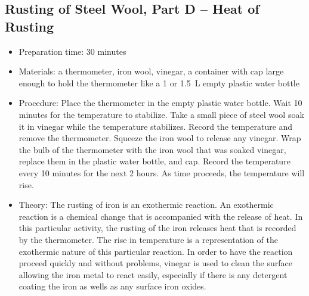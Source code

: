 \subsection{Rusting of Steel Wool, Part D -- Heat of Rusting}
\begin{itemize}
\item{Preparation time: 30 minutes}
\item{Materials: a thermometer, iron wool, vinegar, a container with cap large enough to hold the thermometer like a 1 or 1.5~L empty plastic water bottle}
\item{Procedure: Place the thermometer in the empty plastic water bottle. Wait 10 minutes for the temperature to stabilize. Take a small piece of steel wool soak it in vinegar while the temperature stabilizes. Record the temperature and remove the thermometer. Squeeze the iron wool to release any vinegar. Wrap the bulb of the thermometer with the iron wool that was soaked vinegar, replace them in the plastic water bottle, and cap. Record the temperature every 10 minutes for the next 2 hours. As time proceeds, the temperature will rise.}
\item{Theory: The rusting of iron is an exothermic reaction. An exothermic reaction is a chemical change that is accompanied with the release of heat. In this particular activity, the rusting of the iron releases heat that is recorded by the thermometer. The rise in temperature is a representation of the exothermic nature of this particular reaction. In order to have the reaction proceed quickly and without problems, vinegar is used to clean the surface allowing the iron metal to react easily, especially if there is any detergent coating the iron as wells as any surface iron oxides.}
\end{itemize}

